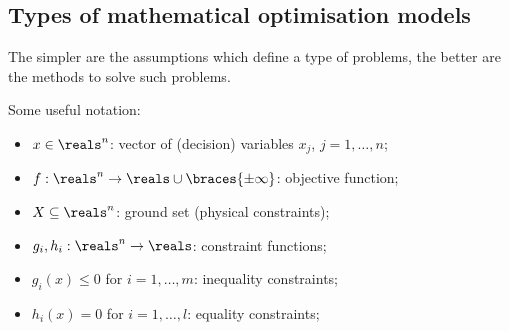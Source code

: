 \subsection{Types of mathematical optimisation models}

The \alert{simpler are the assumptions} which define a type of problems, the better are the \alert{methods to solve such problems}.

Some useful notation:

\begin{itemize}
	\item $x \in \reals^n$: vector of (decision) variables $x_j$, $j = 1,\dots, n$;
	\item $f:\reals^n \rightarrow \reals \cup \braces{\pm \infty}$: objective function;
	\item $X \subseteq \reals^n$: ground set (physical constraints);
	\item $g_i, h_i : \reals^n \rightarrow \reals$: constraint functions; 
	\item $g_i(x) \leq 0$ for $i = 1, \dots, m$: inequality constraints;
	\item $h_i(x) = 0$ for $i = 1, \dots, l$: equality constraints;
\end{itemize}


